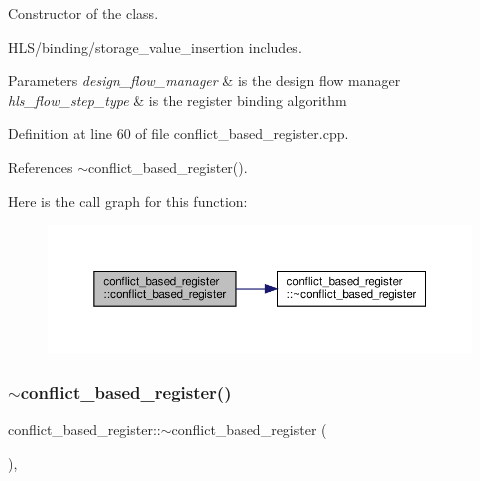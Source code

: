 Constructor of the class. 

H\+L\+S/binding/storage\+\_\+value\+\_\+insertion includes.


\begin{DoxyParams}{Parameters}
{\em design\+\_\+flow\+\_\+manager} & is the design flow manager \\
\hline
{\em hls\+\_\+flow\+\_\+step\+\_\+type} & is the register binding algorithm \\
\hline
\end{DoxyParams}


Definition at line 60 of file conflict\+\_\+based\+\_\+register.\+cpp.



References $\sim$conflict\+\_\+based\+\_\+register().

Here is the call graph for this function\+:
\nopagebreak
\begin{figure}[H]
\begin{center}
\leavevmode
\includegraphics[width=350pt]{da/db2/classconflict__based__register_a435663400dc42783544165ab9b225e5a_cgraph}
\end{center}
\end{figure}
\mbox{\label{classconflict__based__register_a27c2512b494cf700ad195e96291c8cc7}} 
\subsubsection{\texorpdfstring{$\sim$conflict\+\_\+based\+\_\+register()}{~conflict\_based\_register()}}
{\footnotesize\ttfamily conflict\+\_\+based\+\_\+register\+::$\sim$conflict\+\_\+based\+\_\+register (\begin{DoxyParamCaption}{ }\end{DoxyParamCaption})\hspace{0.3cm}{\ttfamily [override]}, {\ttfamily [default]}}



